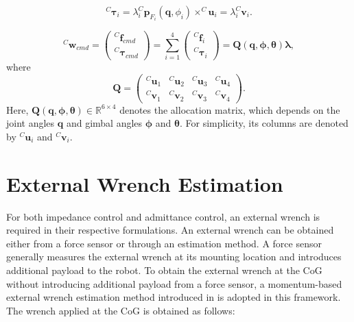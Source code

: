\begin{equation}
\label{eq:allocation for torque dragon}
    {^C\!\boldsymbol{\tau}_i}=\lambda_i^{C}\!\boldsymbol{p}_{F_i}(\boldsymbol{q}, \phi_i ) \times ^{C}\!\!\boldsymbol{u}_i=\lambda_i^{C}\!\boldsymbol{v}_i.
\end{equation}

\begin{equation}
\label{eq:allocation for wrench dragon}
^C\!\boldsymbol{w}_{cmd}=\begin{pmatrix}
^C\!\boldsymbol{f}_{cmd} \\
^C\!\boldsymbol{\tau}_{cmd}
\end{pmatrix}
=
\sum_{i=1}^{4}
\begin{pmatrix}
^C\!\boldsymbol{f}_i \\
^C\!\boldsymbol{\tau}_i
\end{pmatrix} 
=\boldsymbol{Q}(\boldsymbol{q}, \boldsymbol{\phi}, \boldsymbol{\theta})\boldsymbol{\lambda},
\end{equation}
where 
\begin{equation}
\label{eq:Q dragon}
\boldsymbol{Q} = 
\begin{pmatrix}
^C\!\boldsymbol{u}_1&^C\!\boldsymbol{u}_2&^C\!\boldsymbol{u}_3&^C\!\boldsymbol{u}_4\\
^C\!\boldsymbol{v}_1&^C\!\boldsymbol{v}_2&^C\!\boldsymbol{v}_3&^C\!\boldsymbol{v}_4
\end{pmatrix}.
\end{equation}
Here, $\boldsymbol{Q}(\boldsymbol{q}, \boldsymbol{\phi}, \boldsymbol{\theta}) \in \mathbb{R}^{6 \times 4}$ denotes the allocation matrix, which depends on the joint angles $\boldsymbol{q}$ and gimbal angles $\boldsymbol{\phi}$ and $\boldsymbol{\theta}$. For simplicity, its columns are denoted by $^C\boldsymbol{u}_i$ and $^C\boldsymbol{v}_i$.


\section{External Wrench Estimation}

For both impedance control and admittance control, an external wrench is required in their respective formulations. An external wrench can be obtained either from a force sensor or through an estimation method. A force sensor generally measures the external wrench at its mounting location and introduces additional payload to the robot. To obtain the external wrench at the CoG without introducing additional payload from a force sensor, a momentum-based external wrench estimation method introduced in \cite{ruggiero_2014_impedance} is adopted in this framework. The wrench applied at the CoG is obtained as follows:

